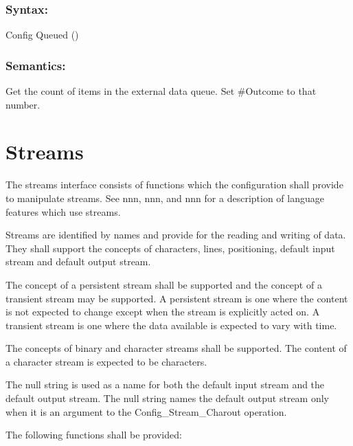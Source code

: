\subsubsection{Syntax:}\label{syntax-22}

Config Queued ()

\subsubsection{Semantics:}\label{semantics-23}

Get the count of items in the external data queue. Set \#Outcome to that
number.

\section{Streams}\label{streams}

The streams interface consists of functions which the configuration
shall provide to manipulate streams. See nnn, nnn, and nnn for a
description of language features which use streams.

Streams are identified by names and provide for the reading and writing
of data. They shall support the concepts of characters, lines,
positioning, default input stream and default output stream.

The concept of a persistent stream shall be supported and the concept of
a transient stream may be supported. A persistent stream is one where
the content is not expected to change except when the stream is
explicitly acted on. A transient stream is one where the data available
is expected to vary with time.

The concepts of binary and character streams shall be supported. The
content of a character stream is expected to be characters.

The null string is used as a name for both the default input stream and
the default output stream. The null string names the default output
stream only when it is an argument to the Config\_Stream\_Charout
operation.

The following functions shall be provided:

